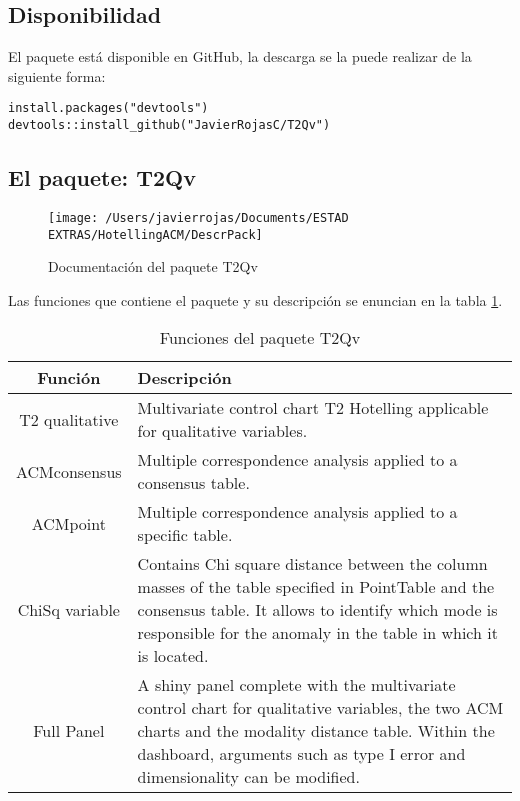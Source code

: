 \documentclass[water,article,submit,moreauthors,pdftex]{mdpi}
\begin{document}
\hypertarget{disponibilidad}{%
\subsection{Disponibilidad}\label{disponibilidad}}

El paquete está disponible en GitHub, la descarga se la puede realizar
de la siguiente forma:

\begin{verbatim}
install.packages("devtools")
devtools::install_github("JavierRojasC/T2Qv")
\end{verbatim}

\hypertarget{el-paquete-t2qv}{%
\subsection{El paquete: T2Qv}\label{el-paquete-t2qv}}

\begin{figure}[!ht]



\begin{center}\texttt{[image: /Users/javierrojas/Documents/ESTAD EXTRAS/HotellingACM/DescrPack]} \end{center}

\caption{Documentación del paquete T2Qv}

\label{fig:documentation}
\end{figure}

Las funciones que contiene el paquete y su descripción se enuncian en la
tabla \ref{tab:functions}.

\begin{table}[!ht]
\begin{center}
 \begin{tabular}{||c  m{35em}||} 
 \hline
  Función & Descripción \\ [0.5ex] 
 \hline\hline
 T2 qualitative & Multivariate control chart T2 Hotelling applicable for qualitative variables.\\
 \hline
  ACMconsensus & Multiple correspondence analysis applied to a consensus table.\\
\hline
  ACMpoint & Multiple correspondence analysis applied to a specific table.\\
\hline
  ChiSq variable & Contains Chi square distance between the column masses of the table specified in PointTable and the consensus table. It allows to identify which mode is responsible for the anomaly in the table in which it is located. \\ [1ex] 
  \hline
  Full Panel & A shiny panel complete with the 
  multivariate control chart for 
  qualitative variables, the two ACM 
  charts and the modality distance table. 
  Within the dashboard, arguments such as 
  type I error and dimensionality can be 
  modified. \\ [1ex] 
 \hline
\end{tabular}\caption{Funciones del paquete T2Qv}
\label{tab:functions}
\end{center}
\end{table}
\end{document}
